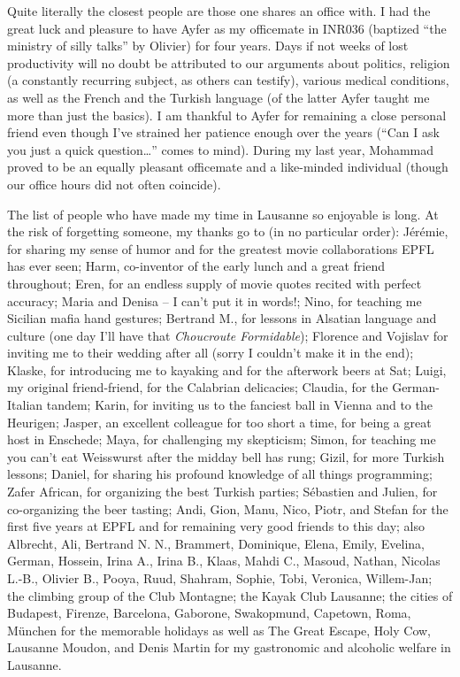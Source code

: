 Quite literally the closest people are those one shares an office with. I had
the great luck and pleasure to have Ayfer as my officemate in INR036 (baptized
``the ministry of silly talks'' by Olivier) for four years. Days if not weeks of
lost productivity will no doubt be attributed to our arguments about politics,
religion (a constantly recurring subject, as others can testify), various
medical conditions, as well as the French and the Turkish language (of the
latter Ayfer taught me more than just the basics). I am thankful to Ayfer for
remaining a close personal friend even though I've strained her patience enough
over the years (``Can I ask you just a quick question\dots'' comes to mind).
During my last year, Mohammad proved to be an equally pleasant officemate and a
like-minded individual (though our office hours did not often coincide). 

The list of people who have made my time in Lausanne so enjoyable is long. At
the risk of forgetting someone, my thanks go to (in no particular order):
Jérémie, for sharing my sense of humor and for the greatest movie collaborations
EPFL has ever seen; Harm, co-inventor of the early lunch and a great friend
throughout; Eren, for an endless supply of movie quotes recited with perfect
accuracy; Maria and Denisa -- I can't put it in words!; Nino, for teaching me
Sicilian mafia hand gestures; Bertrand M., for lessons in Alsatian language and
culture (one day I'll have that \emph{Choucroute Formidable}); Florence and
Vojislav for inviting me to their wedding after all (sorry I couldn't make it in
the end); Klaske, for introducing me to kayaking and for the afterwork beers at
Sat; Luigi, my original friend-friend, for the Calabrian delicacies; Claudia,
for the German-Italian tandem; Karin, for inviting us to the fanciest ball in
Vienna and to the Heurigen; Jasper, an excellent colleague for too short a time,
for being a great host in Enschede; Maya, for challenging my skepticism; Simon,
for teaching me you can't eat Weisswurst after the midday bell has rung; Gizil,
for more Turkish lessons; Daniel, for sharing his profound knowledge of all
things programming; Zafer African, for organizing the best Turkish parties;
Sébastien and Julien, for co-organizing the beer tasting; Andi, Gion, Manu,
Nico, Piotr, and Stefan for the first five years at EPFL and for remaining very
good friends to this day; also Albrecht, Ali, Bertrand N. N., Brammert,
Dominique, Elena, Emily, Evelina, German, Hossein, Irina A., Irina B., Klaas,
Mahdi C., Masoud, Nathan, Nicolas L.-B., Olivier B., Pooya, Ruud, Shahram,
Sophie, Tobi, Veronica, Willem-Jan; the climbing group of the Club Montagne; the
Kayak Club Lausanne; the cities of Budapest, Firenze, Barcelona, Gaborone,
Swakopmund, Capetown, Roma, München for the memorable holidays as well as The
Great Escape, Holy Cow, Lausanne Moudon, and Denis Martin for my gastronomic and
alcoholic welfare in Lausanne. 

